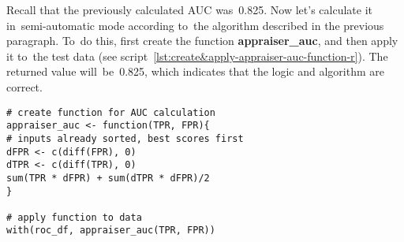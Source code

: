 \documentclass[]{scrreprt}
\begin{document}
Recall that the previously calculated AUC was~0.825. Now let's calculate it in~semi-automatic mode according to~the algorithm described in the previous paragraph. To~do this, first create the function \textbf{appraiser\_auc}, and then apply it to~the test data (see script~\ref{lst:create&apply-appraiser-auc-function-r}). The returned value will~be~0.825, which indicates that the logic and algorithm are correct.
%
\begin{lstlisting}[float=htp, caption = Creating a function to calculate AUC in semi-automatic mode and applying it to test data, firstnumber=1, label= lst:create&apply-appraiser-auc-function-r]
# create function for AUC calculation
appraiser_auc <- function(TPR, FPR){
# inputs already sorted, best scores first 
dFPR <- c(diff(FPR), 0)
dTPR <- c(diff(TPR), 0)
sum(TPR * dFPR) + sum(dTPR * dFPR)/2
}

# apply function to data
with(roc_df, appraiser_auc(TPR, FPR))
\end{lstlisting}
\end{document}
